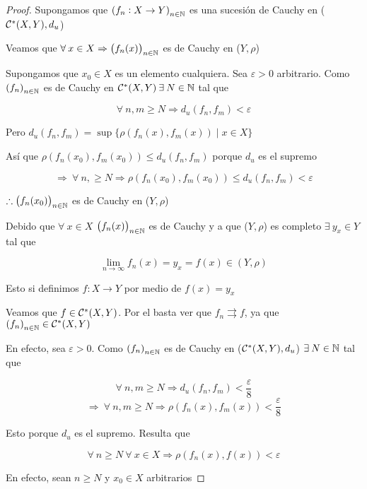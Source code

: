 \begin{proof}
    Supongamos que  ${\left(f_n : X \to Y\right)}_{n \in \mathbb{N}}$ es una sucesión de Cauchy en (${\mathcal{C}}^{\ast}(X,Y), d_u$)

    Veamos que $\forall \: x \in X \Rightarrow {\left(f_n (x)\right)}_{n \in \mathbb{N}}$ es de Cauchy en ($Y,\rho$)

    Supongamos que $x_0 \in X$ es un elemento cualquiera. Sea $\varepsilon > 0$ arbitrario. Como  ${\left(f_n\right)}_{n \in \mathbb{N}}$ es de Cauchy en ${\mathcal{C}}^{\ast}(X,Y) \: \exists \: N \in \mathbb{N}$ tal que

    $$\forall \: n, m \geqslant N \Rightarrow d_u(f_n,f_m) < \varepsilon$$

    Pero $d_u(f_n,f_m) = \sup \{ \rho(f_n(x),f_m(x)) \mid x \in X\}$

    Así que $\rho(f_n(x_0),f_m(x_0)) \leqslant d_u(f_n,f_m)$ porque $d_u$ es el supremo

    $$\Rightarrow \: \forall \: n,  \geqslant N \Rightarrow \rho(f_n(x_0),f_m(x_0)) \leqslant  d_u(f_n,f_m) < \varepsilon$$

    $\therefore {\left(f_n (x_0) \right)}_{n \in \mathbb{N}}$ es de Cauchy en ($Y,\rho$)

    Debido que $\forall \: x \in X $ ${\left(f_n (x)\right)}_{n \in \mathbb{N}}$ es de Cauchy y a que ($Y, \rho$) es completo $\exists \: y_x \in Y$ tal que

    $$\lim_{n \to \infty} f_n(x) = y_x = f(x) \in (Y, \rho)$$

    Esto si definimos $f : X \to Y$ por medio de $f(x) = y_x$

    Veamos que $f \in {\ensuremath{\mathcal{C}}}^{\ast}(X,Y)$. Por el  basta ver que $f_n \rightrightarrows f$, ya que ${\left(f_n \right)}_{n \in \mathbb{N}} \in {\ensuremath{\mathcal{C}}}^{\ast}(X,Y)$

    En efecto, sea $\varepsilon > 0$. Como ${\left(f_n \right)}_{n \in \mathbb{N}}$ es de Cauchy en (${\mathcal{C}}^{\ast}(X,Y), d_u$) $\exists \: N \in \mathbb{N}$ tal que

    $$\forall \: n, m \geqslant N \Rightarrow d_u(f_n, f_m) < \frac{\varepsilon}{8}$$
    $$\Rightarrow \: \forall \: n, m \geqslant N \Rightarrow \rho(f_n(x),f_m(x)) < \frac{\varepsilon}{8}$$

    Esto porque $d_u $ es el supremo. Resulta que 

    $$\forall \: n \geqslant N \: \forall \: x \in X \Rightarrow \rho(f_n(x),f(x)) < \varepsilon$$

    En efecto, sean $n \geqslant N$ y $x_0 \in X$ arbitrarios


\end{proof}
